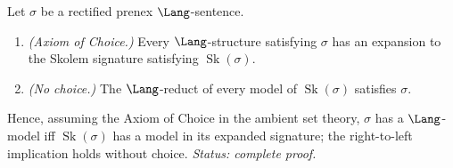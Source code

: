 \begin{theorem}
\label{thm:skolem-equisatisfiable}
Let \(\sigma\) be a rectified prenex \(\Lang\)-sentence.
\begin{enumerate}
  \item \emph{(Axiom of Choice.)}  Every \(\Lang\)-structure satisfying
        \(\sigma\) has an expansion to the Skolem signature satisfying
        \(\operatorname{Sk}(\sigma)\).
  \item \emph{(No choice.)}  The \(\Lang\)-reduct of every model of
        \(\operatorname{Sk}(\sigma)\) satisfies \(\sigma\).
\end{enumerate}
Hence, assuming the Axiom of Choice in the ambient set theory, \(\sigma\)
has a \(\Lang\)-model iff \(\operatorname{Sk}(\sigma)\) has a model in its
expanded signature; the right-to-left implication holds without choice.
\textit{Status: complete proof.}
\end{theorem}
